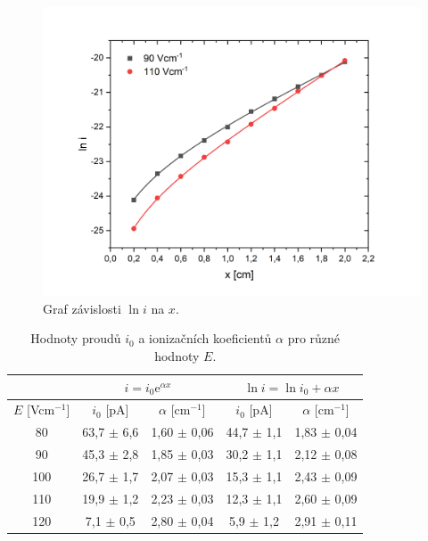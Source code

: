 \documentclass[a4paper,12pt]{article}
\newcommand{\e}{\text{e}}
\begin{document}
\begin{figure}[h!]
	\centering
	\includegraphics[width=145mm]{iposun90-110.png}
	\caption{Graf závislosti $\ln i$ na $x$.}
	\label{iposun90-110}
\end{figure}


\begin{center}
	\begin{table}[h]
		\centering
		\caption{Hodnoty proudů $i_0$ a ionizačních koeficientů $\alpha$ pro různé hodnoty $E$.}
		\label{tab1}
		\begin{tabular}{|c|c|c|c|c|} \hline
			\multicolumn{1}{|c|}{}  & \multicolumn{2}{c|}{$i = i_0 \e^{\alpha 
					x}$}& \multicolumn{2}{c|}{$\ln i = \ln i_0 + \alpha x$}  \\ \hline
			$E$ [Vcm$^{-1}$] & $i_0$ [pA] & $\alpha$ [cm$^{-1}$] & $i_0$ [pA] & $\alpha$ [cm$^{-1}$] \\ \hline
			80 & 63,7 $\pm$ 6,6 & 1,60 $\pm$ 0,06 & 44,7 $\pm$ 1,1 & 1,83 $\pm$ 
			0,04\\ \hline
			90 & 45,3 $\pm$ 2,8 & 1,85 $\pm$ 0,03& 30,2 $\pm$ 1,1 & 2,12 $\pm$ 
			0,08\\ \hline
			100 & 26,7 $\pm$ 1,7 & 2,07 $\pm$ 0,03 & 15,3 $\pm$ 1,1 & 2,43 
			$\pm$ 0,09\\ \hline
			110 & 19,9 $\pm$ 1,2 & 2,23 $\pm$ 0,03 & 12,3 $\pm$ 1,1 & 2,60 
			$\pm$ 0,09 \\ \hline
			120 & 7,1 $\pm$ 0,5 & 2,80 $\pm$ 0,04 & 5,9 $\pm$ 1,2 & 2,91 
			$\pm$ 0,11 \\ \hline
			
		\end{tabular}
	\end{table}
\end{center}
\end{document}
